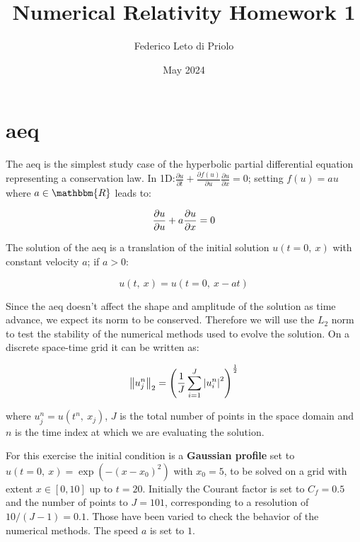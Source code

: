 \documentclass[11pt, a4paper]{article}
\title{Numerical Relativity Homework 1}
\author{Federico Leto di Priolo}
\date{May 2024}
\begin{document}
\maketitle

\section{\acrfull{aeq}}

The \acrshort{aeq} is the simplest study case of the hyperbolic partial
differential equation representing a conservation law. In 1D:\(\frac{\partial
    u}{\partial t} + \frac{\partial f(u)}{\partial u} \frac{\partial u}{\partial x}
= 0\); setting \(f(u) = au\) where \(a \in \mathbbm{R}\) leads to:

\begin{equation} \label{eq:adv_eq}
    \pdv{u}{u} + a \pdv{u}{x} = 0
\end{equation}

\noindent
The solution of the \acrshort{aeq} is a translation of the initial solution
\(u(t = 0,\ x)\) with constant velocity \(a\); if \(a > 0\):

\begin{equation} \label{eq:adv_sol}
    u(t,\ x) = u(t = 0,\ x - at)
\end{equation}

Since the \acrshort{aeq} doesn't affect the shape and amplitude of the solution
as time advance, we expect its norm to be conserved. Therefore we will use the
\(L_2\) norm to test the stability of the numerical methods used to evolve the
solution. On a discrete space-time grid it can be written as:

\begin{equation} \label{eq:l2_norm}
    \norm{u^n_j}_2 = \qty(\frac{1}{J} \sum_{i = 1}^J \abs{u^n_i}^2)^\frac{1}{2}
\end{equation}

\noindent
where \(u^n_j = u(t^n,\ x_j)\), \(J\) is the total number of points in the space
domain and \(n\) is the time index at which we are evaluating the solution.

For this exercise the initial condition is a \textbf{Gaussian profile} set to
\(u(t = 0,\ x) = \exp(-(x - x_0)^2)\) with \(x_0 = 5\), to be solved on a grid
with extent \(x \in [0, 10]\) up to \(t = 20\). Initially the Courant factor is
set to \(C_f = 0.5\) and the number of points to \(J = 101\), corresponding to
a resolution of \(10 / (J - 1) = 0.1\). Those have been varied to check the
behavior of the numerical methods. The speed \(a\) is set to \(1\).
\end{document}
